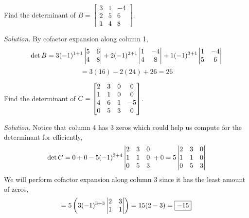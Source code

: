 \begin{example}
Find the determinant of $\displaystyle B = \left[ 
\begin{matrix}
    3 & 1 & -4 \\
    2 & 5 & 6 \\
    1 & 4 & 8
\end{matrix}
\right]$.
\end{example}

\textit{Solution.} By cofactor expansion along column 1,
$$\det B = 3(-1)^{1+1}
\begin{vmatrix} 
5 & 6 \\
4 & 8
 \end{vmatrix} + 
2(-1)^{2 + 1}
\begin{vmatrix} 
1 & -4 \\
4 & 8
 \end{vmatrix} +
1(-1)^{3 + 1}
\begin{vmatrix} 
1 & -4 \\
5 & 6
 \end{vmatrix}
$$
$$=3(16) -2(24) + 26 = \boxed{26}$$

\newpage
\begin{example}
Find the determinant of $\displaystyle C = \begin{bmatrix} 
2 & 3 & 0 & 0 \\
1 & 1 & 0 & 0 \\
4 & 6 & 1 & -5 \\
0 & 5 & 3 & 0
 \end{bmatrix}$.
\end{example}

\textit{Solution.} Notice that column 4 has 3 zeros which could help us compute for the determinant for efficiently,
$$\det C = 0 + 0 -5(-1)^{3 + 4}\begin{vmatrix} 
2 & 3 & 0 \\
1 & 1 & 0 \\
0 & 5 & 3
 \end{vmatrix} + 0 = 5 \begin{vmatrix} 
2 & 3 & 0 \\
1 & 1 & 0 \\
0 & 5 & 3
 \end{vmatrix}$$
We will perform cofactor expansion along column 3 since it has the least amount of zeros,
$$=5\left(3(-1)^{3+3}\begin{vmatrix} 
2 & 3 \\
1 & 1
 \end{vmatrix}\right) = 15(2 - 3) = \boxed{-15}$$

